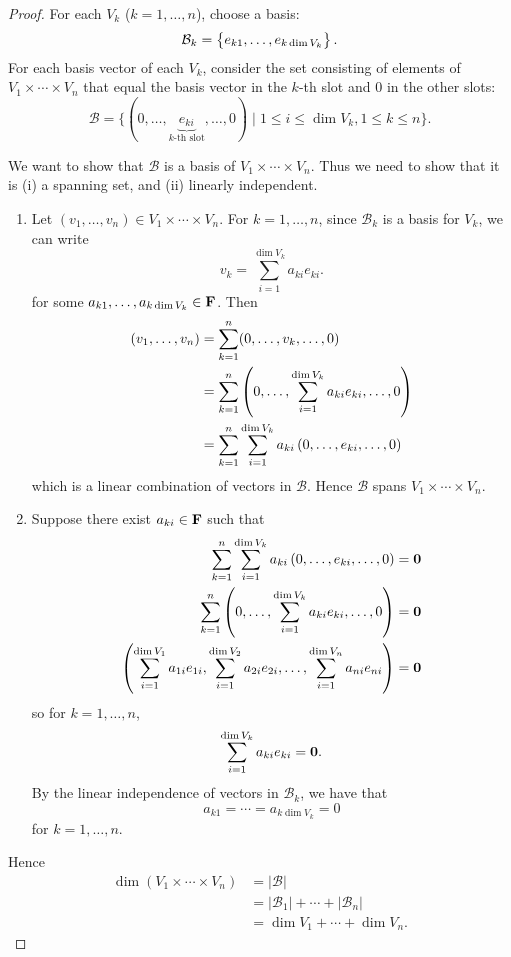 \begin{proof}
For each $V_k$ ($k=1,\dots,n$), choose a basis:
\[\mathcal{B}_k=\left\{e_{k1},\dots,e_{k\dim V_k}\right\}.\]
For each basis vector of each $V_k$, consider the set consisting of elements of $V_1\times\cdots\times V_n$ that equal the basis vector in the $k$-th slot and $0$ in the other slots:
\[\mathcal{B}=\{(0,\dots,\underbrace{e_{ki}}_\text{$k$-th slot},\dots,0)\mid 1\le i\le\dim V_k,1\le k\le n\}.\]

We want to show that $\mathcal{B}$ is a basis of $V_1\times\cdots\times V_n$. Thus we need to show that it is (i) a spanning set, and (ii) linearly independent.
\begin{enumerate}[label=(\roman*)]
\item Let $(v_1,\dots,v_n)\in V_1\times\cdots\times V_n$. For $k=1,\dots,n$, since $\mathcal{B}_k$ is a basis for $V_k$, we can write
\[v_k=\sum_{i=1}^{\dim V_k}a_{ki}e_{ki}.\]
for some $a_{k1},\dots,a_{k\dim V_k}\in\mathbf F$. Then
\begin{align*}
(v_1,\dots,v_n)
&=\sum_{k=1}^{n}(0,\dots,v_k,\dots,0)\\
&=\sum_{k=1}^{n}\left(0,\dots,\sum_{i=1}^{\dim V_k}a_{ki}e_{ki},\dots,0\right)\\
&=\sum_{k=1}^{n}\sum_{i=1}^{\dim V_k}a_{ki}\left(0,\dots,e_{ki},\dots,0\right)
\end{align*}
which is a linear combination of vectors in $\mathcal{B}$. Hence $\mathcal{B}$ spans $V_1\times\cdots\times V_n$.

\item Suppose there exist $a_{ki}\in\mathbf F$ such that
\begin{align*}
\sum_{k=1}^{n}\sum_{i=1}^{\dim V_k}a_{ki}\left(0,\dots,e_{ki},\dots,0\right)&=\vb{0}\\
\sum_{k=1}^{n}\left(0,\dots,\sum_{i=1}^{\dim V_k}a_{ki}e_{ki},\dots,0\right)&=\vb{0}\\
\left(\sum_{i=1}^{\dim V_1}a_{1i}e_{1i},\sum_{i=1}^{\dim V_2}a_{2i}e_{2i},\dots,\sum_{i=1}^{\dim V_n}a_{ni}e_{ni}\right)&=\vb{0}
\end{align*}
so for $k=1,\dots,n$,
\[\sum_{i=1}^{\dim V_k}a_{ki}e_{ki}=\vb{0}.\]
By the linear independence of vectors in $\mathcal{B}_k$, we have that
\[a_{k1}=\cdots=a_{k\dim V_k}=0\]
for $k=1,\dots,n$.
\end{enumerate}

Hence
\begin{align*}
\dim(V_1\times\cdots\times V_n)&=|\mathcal{B}|\\
&=|\mathcal{B}_1|+\cdots+|\mathcal{B}_n|\\
&=\dim V_1+\cdots+\dim V_n.
\end{align*}
\end{proof}

